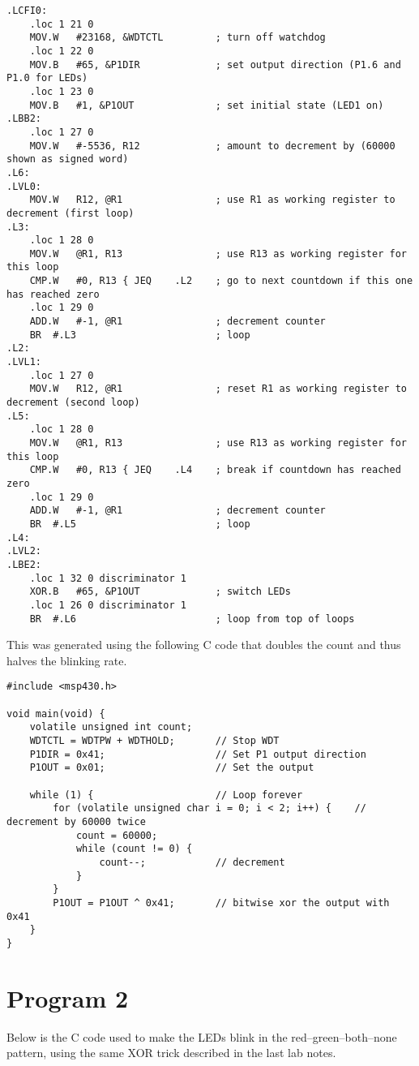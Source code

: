 \documentclass[letterpaper]{article}
\begin{document}
		\begin{verbatim}
.LCFI0:
	.loc 1 21 0
	MOV.W   #23168, &WDTCTL         ; turn off watchdog
	.loc 1 22 0
	MOV.B   #65, &P1DIR             ; set output direction (P1.6 and P1.0 for LEDs)
	.loc 1 23 0
	MOV.B   #1, &P1OUT              ; set initial state (LED1 on)
.LBB2:
	.loc 1 27 0
	MOV.W   #-5536, R12             ; amount to decrement by (60000 shown as signed word)
.L6:
.LVL0:
	MOV.W   R12, @R1                ; use R1 as working register to decrement (first loop)
.L3:
	.loc 1 28 0
	MOV.W   @R1, R13                ; use R13 as working register for this loop
	CMP.W   #0, R13 { JEQ    .L2    ; go to next countdown if this one has reached zero
	.loc 1 29 0
	ADD.W   #-1, @R1                ; decrement counter
	BR  #.L3                        ; loop
.L2:
.LVL1:
	.loc 1 27 0
	MOV.W   R12, @R1                ; reset R1 as working register to decrement (second loop)
.L5:
	.loc 1 28 0
	MOV.W   @R1, R13                ; use R13 as working register for this loop
	CMP.W   #0, R13 { JEQ    .L4    ; break if countdown has reached zero
	.loc 1 29 0
	ADD.W   #-1, @R1                ; decrement counter
	BR  #.L5                        ; loop
.L4:
.LVL2:
.LBE2:
	.loc 1 32 0 discriminator 1
	XOR.B   #65, &P1OUT             ; switch LEDs
	.loc 1 26 0 discriminator 1
	BR  #.L6                        ; loop from top of loops
		\end{verbatim}
		
		\newpage
		This was generated using the following C code that doubles the count and thus halves the blinking rate. 
		
		\begin{verbatim}
#include <msp430.h>

void main(void) {
    volatile unsigned int count;
    WDTCTL = WDTPW + WDTHOLD;       // Stop WDT
    P1DIR = 0x41;                   // Set P1 output direction
    P1OUT = 0x01;                   // Set the output
    
    while (1) {                     // Loop forever
        for (volatile unsigned char i = 0; i < 2; i++) {    // decrement by 60000 twice
            count = 60000;
            while (count != 0) {
                count--;            // decrement
            }
        }
        P1OUT = P1OUT ^ 0x41;       // bitwise xor the output with 0x41
    }
}
		\end{verbatim}
	
	\section{Program 2}
		Below is the C code used to make the LEDs blink in the red--green--both--none pattern, using the same XOR trick described in the last lab notes.
		
\end{document}
